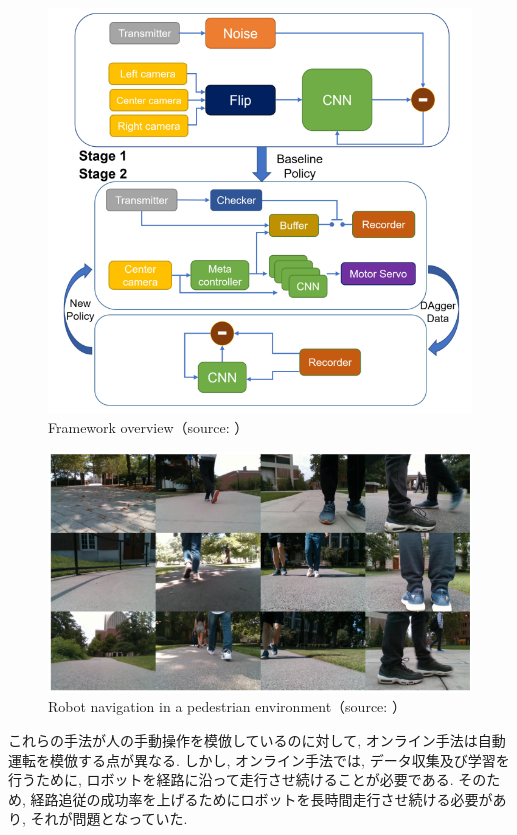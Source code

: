 \begin{figure}[h]
     \centering
     \includegraphics[keepaspectratio, scale=0.4]
     {images/jing-bi.png}
     \caption{Framework overview（source: \cite{Jing}）}
     \label{Fig:jing-bi}
     \end{figure}

\begin{figure}[h]
     \centering
     \includegraphics[keepaspectratio, scale=0.4]
     {images/pedestrian.png}
     \caption{Robot navigation in a pedestrian environment（source: \cite{Jing}）}
     \label{Fig:pedestrian}
     \end{figure}

\newpage
これらの手法が人の手動操作を模倣しているのに対して, オンライン手法は自動運転を模倣する点が異なる. しかし, オンライン手法では, データ収集及び学習を行うために, ロボットを経路に沿って走行させ続けることが必要である. そのため, 経路追従の成功率を上げるためにロボットを長時間走行させ続ける必要があり, それが問題となっていた. 

